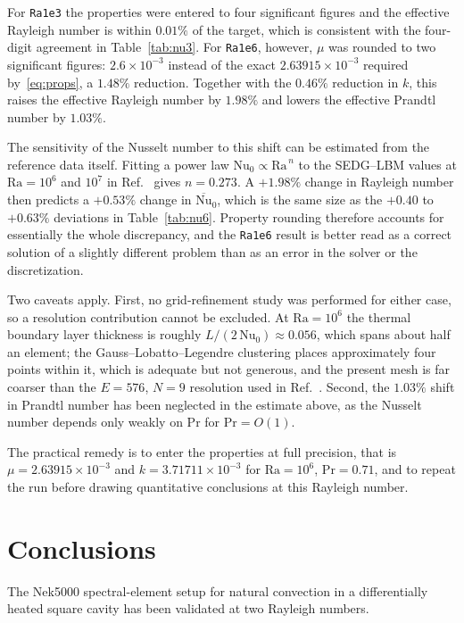 \documentclass[11pt,a4paper]{article}
\begin{document}
For \texttt{Ra1e3} the properties were entered to four significant figures and
the effective Rayleigh number is within $0.01\%$ of the target, which is
consistent with the four-digit agreement in Table~\ref{tab:nu3}. For
\texttt{Ra1e6}, however, $\mu$ was rounded to two significant figures:
$2.6\times10^{-3}$ instead of the exact $2.63915\times10^{-3}$ required
by~\eqref{eq:props}, a $1.48\%$ reduction. Together with the $0.46\%$ reduction
in $k$, this raises the effective Rayleigh number by $1.98\%$ and lowers the
effective Prandtl number by $1.03\%$.

The sensitivity of the Nusselt number to this shift can be estimated from the
reference data itself. Fitting a power law $\mathrm{Nu}_0\propto
\mathrm{Ra}^{\,n}$ to the SEDG--LBM values at $\mathrm{Ra}=10^{6}$ and $10^{7}$
in Ref.~\cite{patel2014} gives $n=0.273$. A $+1.98\%$ change in Rayleigh number
then predicts a $+0.53\%$ change in $\overline{\mathrm{Nu}}_0$, which is the
same size as the $+0.40$ to $+0.63\%$ deviations in Table~\ref{tab:nu6}.
Property rounding therefore accounts for essentially the whole discrepancy, and
the \texttt{Ra1e6} result is better read as a correct solution of a slightly
different problem than as an error in the solver or the discretization.

Two caveats apply. First, no grid-refinement study was performed for either
case, so a resolution contribution cannot be excluded. At $\mathrm{Ra}=10^{6}$
the thermal boundary layer thickness is roughly $L/(2\,\mathrm{Nu}_0)\approx
0.056$, which spans about half an element; the Gauss--Lobatto--Legendre
clustering places approximately four points within it, which is adequate but
not generous, and the present mesh is far coarser than the $E=576$, $N=9$
resolution used in Ref.~\cite{patel2014}. Second, the $1.03\%$ shift in Prandtl
number has been neglected in the estimate above, as the Nusselt number depends
only weakly on $\mathrm{Pr}$ for $\mathrm{Pr}=O(1)$.

The practical remedy is to enter the properties at full precision, that is
$\mu = 2.63915\times10^{-3}$ and $k = 3.71711\times10^{-3}$ for
$\mathrm{Ra}=10^{6}$, $\mathrm{Pr}=0.71$, and to repeat the run before drawing
quantitative conclusions at this Rayleigh number.

\section{Conclusions}
The Nek5000 spectral-element setup for natural convection in a differentially
heated square cavity has been validated at two Rayleigh numbers.
\end{document}
